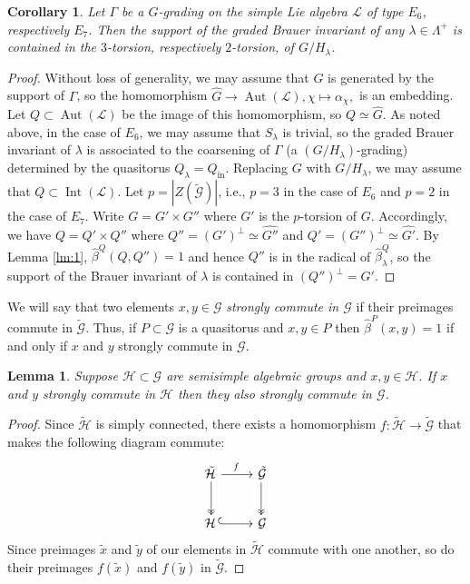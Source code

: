 \documentclass[a4paper,reqno]{amsart}
\newtheorem{lemma}[theorem]{Lemma}
\newtheorem{corollary}[theorem]{Corollary}
\theoremstyle{definition}
\numberwithin{theorem}{section}
\numberwithin{equation}{section}
\begin{document}
\begin{corollary}\label{cor:Brauer_E6E7}
Let $\Gamma$ be a $G$-grading on the simple Lie algebra ${\mathcal{L}}$ of type $E_6$, respectively $E_7$. Then the support of the graded Brauer invariant of any $\lambda\in\Lambda^+$ is contained in the $3$-torsion, respectively $2$-torsion, of $G/H_\lambda$.
\end{corollary}

\begin{proof}
Without loss of generality, we may assume that $G$ is generated by the support of $\Gamma$, so the homomorphism  ${\widehat{{G}}}\to\operatorname{\mathrm{Aut}}({\mathcal{L}}), \chi\mapsto\alpha_\chi,$ is an embedding. Let $Q\subset\operatorname{\mathrm{Aut}}({\mathcal{L}})$ be the image of this homomorphism, so $Q\simeq{\widehat{{G}}}$. As noted above, in the case of $E_6$, we may assume that $S_\lambda$ is trivial, so the graded Brauer invariant of $\lambda$ is associated to the coarsening of $\Gamma$ (a $(G/H_\lambda)$-grading) determined by the quasitorus $Q_\lambda=Q_\mathrm{in}$. Replacing $G$ with $G/H_\lambda$, we may assume that $Q\subset\operatorname{\mathrm{Int}}({\mathcal{L}})$. 
Let $p=|Z(\tilde{\mathcal{G}})|$, i.e., $p=3$ in the case of $E_6$ and $p=2$ in the case of $E_7$. Write $G=G'\times G''$ where $G'$ is the $p$-torsion of $G$. Accordingly, we have $Q=Q'\times Q''$ where $Q''=(G')^\perp\simeq{\widehat{{G''}}}$ and $Q'=(G'')^\perp\simeq{\widehat{{G'}}}$. By Lemma \ref{lm:1}, $\hat{\beta}^Q(Q,Q'')=1$ and hence $Q''$ is in the radical of $\hat{\beta}^Q_\lambda$, so the support of the Brauer invariant of $\lambda$ is contained in $(Q'')^\perp=G'$. 
\end{proof}

We will say that two elements $x,y\in{\mathcal{G}}$ {\em strongly commute in ${\mathcal{G}}$} if their preimages commute in $\tilde{\mathcal{G}}$. Thus, if $P\subset{\mathcal{G}}$ is a quasitorus and $x,y\in P$ then $\hat{\beta}^P(x,y)=1$ if and only if $x$ and $y$ strongly commute in ${\mathcal{G}}$.

\begin{lemma}\label{lm:2}
Suppose ${\mathcal{H}}\subset{\mathcal{G}}$ are semisimple algebraic groups and $x,y\in{\mathcal{H}}$. If $x$ and $y$ strongly commute in ${\mathcal{H}}$ then they also strongly commute in ${\mathcal{G}}$.
\end{lemma}

\begin{proof}
Since $\tilde{\mathcal{H}}$ is simply connected, there exists a homomorphism $f\colon\tilde{\mathcal{H}}\to\tilde{\mathcal{G}}$ that makes the following diagram commute:
\[
\xymatrix{
\tilde{\mathcal{H}}\,\ar[r]^{f}\ar@{->>}[d] & \,\tilde{\mathcal{G}}\ar@{->>}[d]\\
{\mathcal{H}}\,\ar@{^{(}->}[r] & \,{\mathcal{G}}
}
\]
Since preimages $\tilde{x}$ and $\tilde{y}$ of our elements in $\tilde{\mathcal{H}}$ commute with one another, so do their preimages $f(\tilde{x})$ and $f(\tilde{y})$ in $\tilde{\mathcal{G}}$.
\end{proof}
\end{document}
